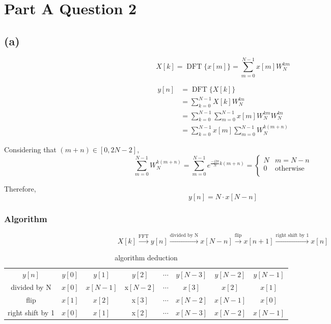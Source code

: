 \documentclass{article}
\DeclareMathOperator{\DFT}{DFT}
\newenvironment{homeworkProblem}[1]{
	\section*{#1}
	}{
}
\newenvironment{homeworkSection}[1]{
	\subsection*{#1}
	}{
}
\begin{document}

\begin{homeworkProblem}{Part A Question 2}


\begin{homeworkSection}{(a)}

\begin{equation}
X[k] = \DFT\{x[m]\} = \sum_{m=0}^{N-1} x[m] W_{N}^{km}
\end{equation}

\begin{align*}
y[n] &= \DFT\{X[k]\}\\
&= \sum_{k=0}^{N-1} X[k] W_{N}^{kn}\\
&= \sum_{k=0}^{N-1} \sum_{m=0}^{N-1} x[m] W_{N}^{km} W_{N}^{kn}\\
&= \sum_{k=0}^{N-1} x[m] \sum_{m=0}^{N-1} W_{N}^{k(m+n)}
\end{align*}

Considering that $(m+n) \in [0, 2N-2]$,
\begin{equation}
\sum_{m=0}^{N-1} W_{N}^{k(m+n)} = \sum_{m=0}^{N-1} e^{\frac{-j 2\pi}{N} k(m+n)} =
\begin{cases}
N & m = N-n\\
0 & \text{otherwise}\\ 
\end{cases}
\end{equation}

Therefore,
\begin{equation}
y[n] = N \cdot x[N-n]
\end{equation}

\subsubsection*{Algorithm}
\begin{equation}
X[k] \xrightarrow{\text{FFT}} y[n] \xrightarrow{\text{divided by N}} x[N-n] \xrightarrow{\text{flip}} x[n+1] \xrightarrow{\text{right shift by 1}} x[n]
\end{equation}

\begin{table}[!hbp]
\centering
\begin{tabular}{c c c c c c c c}
$y[n]$ &$y[0]$ &$y[1]$ &$y[2]$ &$\cdots$ &$y[N-3]$ &$y[N-2]$ &$y[N-1]$ \\
divided by N &$x[0]$ &$x[N-1]$ &x$[N-2]$ &$\cdots$ &$x[3]$ &$x[2]$ &$x[1]$ \\
flip &$x[1]$ &$x[2]$ &x$[3]$ &$\cdots$ &$x[N-2]$ &$x[N-1]$ &$x[0]$ \\
right shift by 1 &$x[0]$ &$x[1]$ &x$[2]$ &$\cdots$ &$x[N-3]$ &$x[N-2]$ &$x[N-1]$ \\
\end{tabular}
\caption{algorithm deduction}
\end{table}


\end{homeworkSection}
\end{homeworkProblem}
\end{document}
